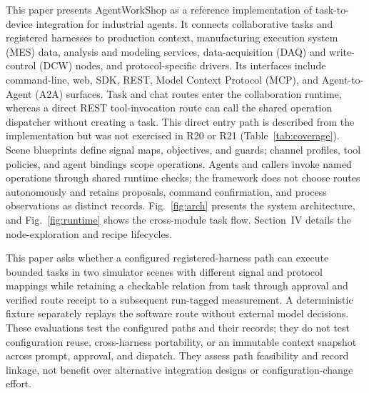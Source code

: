This paper presents AgentWorkShop as a reference implementation of
task-to-device integration for industrial agents. It connects collaborative tasks
and registered harnesses to production context, manufacturing execution
system (MES) data, analysis and modeling services, data-acquisition (DAQ) and
write-control (DCW) nodes, and protocol-specific drivers. Its interfaces include
command-line, web, SDK, REST, Model Context Protocol (MCP), and Agent-to-Agent
(A2A) surfaces. Task and chat routes enter the
collaboration runtime, whereas a direct REST tool-invocation route can call
the shared operation dispatcher without creating a task. This direct entry
path is described from the implementation but was not exercised in R20 or
R21 (Table~\ref{tab:coverage}).
Scene blueprints define signal maps, objectives, and guards; channel profiles,
tool policies, and agent bindings scope operations. Agents and callers invoke
named operations through shared runtime checks; the framework does not choose
routes autonomously and retains proposals, command confirmation, and process
observations as distinct records. Fig.~\ref{fig:arch} presents the system
architecture, and Fig.~\ref{fig:runtime} shows the cross-module task flow.
Section~IV details the node-exploration and recipe lifecycles.

This paper asks whether a configured registered-harness path can execute
bounded tasks in two simulator scenes with different signal and protocol
mappings while retaining a checkable relation from task through approval and
verified route receipt to a subsequent run-tagged measurement. A deterministic
fixture separately replays the software route without external model
decisions. These evaluations test the configured paths and their records; they
do not test configuration reuse, cross-harness portability, or an immutable
context snapshot across prompt, approval, and dispatch. They assess path
feasibility and record linkage, not benefit over alternative integration
designs or configuration-change effort.

